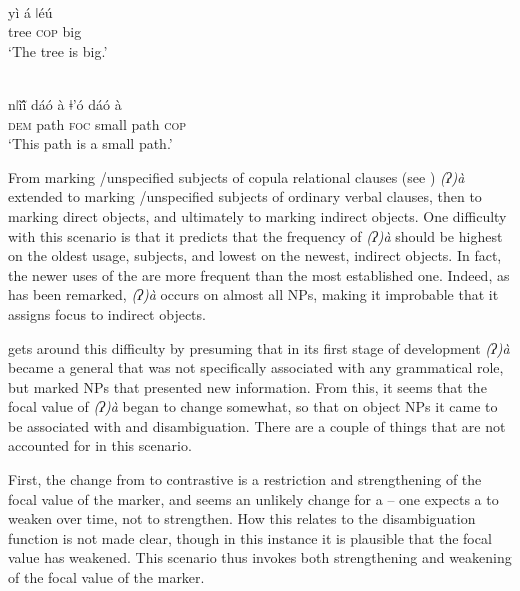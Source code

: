 \documentclass[output=paper]{LSP/langsci}
\begin{document}
\begin{exe}
\ex\label{09-mc-ex:37} 
\\
\gll yì á ǀéú\\
tree \textsc{cop} big\\
\glt ‘The tree is big.’ 
\end{exe}

\begin{exe}
\ex\label{09-mc-ex:38} 
\\
\gll nǀĩĩ́ dáó à ǂ’ó dáó à \\
\textsc{dem}{\rmfnm} path \textsc{foc} small path \textsc{cop}\\
\glt ‘This path is a small path.’ 
\end{exe}


From marking /unspecified subjects of copula relational clauses (see ) \textit{(ʔ)à} extended to marking /unspecified subjects of ordinary verbal clauses, then to marking direct objects, and ultimately to marking indirect objects. One difficulty with this scenario is that it predicts that the frequency of \textit{(ʔ)à} should be highest on the oldest usage, subjects, and lowest on the newest, indirect objects. In fact, the newer uses of the  are more frequent than the most established one. Indeed, as has been remarked, \textit{(ʔ)à} occurs on almost all  NPs, making it improbable that it assigns focus to indirect objects.

 gets around this difficulty by presuming that in its first stage of development \textit{(ʔ)à} became a general  that was not specifically associated with any grammatical role, but marked NPs that presented new information. From this, it seems that the focal value of \textit{(ʔ)à} began to change somewhat, so that on object NPs it came to be associated with  and disambiguation. There are a couple of things that are not accounted for in this scenario.

First, the change from  to contrastive  is a restriction and strengthening of the focal value of the marker, and seems an unlikely change for a  – one expects a  to weaken over time, not to strengthen. How this relates to the disambiguation function is not made clear, though in this instance it is plausible that the focal value has weakened. This scenario thus invokes both strengthening and weakening of the focal value of the marker.
\end{document}
